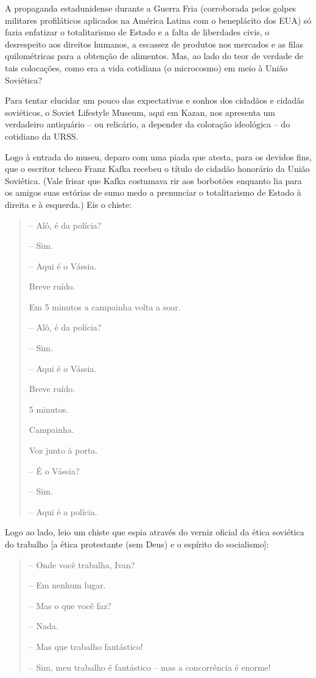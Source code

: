 A propaganda estadunidense durante a Guerra Fria (corroborada pelos
golpes militares profiláticos aplicados na América Latina com o
beneplácito dos EUA) só fazia enfatizar o totalitarismo de Estado e a
falta de liberdades civis, o desrespeito aos direitos humanos, a
escassez de produtos nos mercados e as filas quilométricas para a
obtenção de alimentos. Mas, ao lado do teor de verdade de tais
colocações, como era a vida cotidiana (o microcosmo) em meio à União
Soviética?

Para tentar elucidar um pouco das expectativas e sonhos dos cidadãos e
cidadãs soviéticos, o Soviet Lifestyle Museum, aqui em Kazan, nos
apresenta um verdadeiro antiquário -- ou relicário, a depender da
coloração ideológica -- do cotidiano da URSS.

Logo à entrada do museu, deparo com uma piada que atesta, para os
devidos fins, que o escritor tcheco Franz Kafka recebeu o título de
cidadão honorário da União Soviética. (Vale frisar que Kafka costumava
rir aos borbotões enquanto lia para os amigos suas estórias de sumo medo
a prenunciar o totalitarismo de Estado à direita e à esquerda.) Eis o
chiste:

\begin{quote}
-- Alô, é da polícia?

-- Sim.

-- Aqui é o Vássia.

Breve ruído.

Em 5 minutos a campainha volta a soar.

-- Alô, é da polícia?

-- Sim.

-- Aqui é o Vássia.

Breve ruído.

5 minutos.

Campainha.

Voz junto à porta.

-- É o Vássia?

-- Sim.

-- Aqui é a polícia.
\end{quote}

Logo ao lado, leio um chiste que espia através do verniz oficial da
ética soviética do trabalho {[}a ética protestante (sem Deus) e o
espírito do socialismo{]}:

\begin{quote}
-- Onde você trabalha, Ivan?

-- Em nenhum lugar.

-- Mas o que você faz?

-- Nada.

-- Mas que trabalho fantástico!

-- Sim, meu trabalho é fantástico -- mas a concorrência é enorme!
\end{quote}

